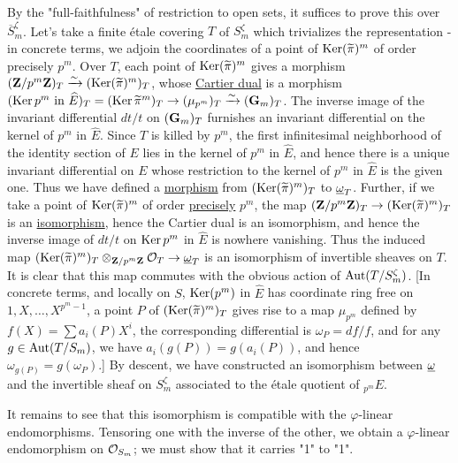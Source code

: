 \begin{kaproof}
By the "full-faithfulness" of restriction to open sets, it suffices to prove
this over $\overline{S}_m^\zeta$. Let's take a finite \'etale covering $T$ of
$S_m^\zeta$ which trivializes the representation - in concrete terms, we adjoin
the coordinates of a point of $\operatorname{Ker}(\widetilde{\pi})^m$ of order precisely
$p^m$. Over $T$, each point of $\operatorname{Ker}(\widetilde{\pi})^m$ gives a morphism
$(\mathbf{Z}/p^m\mathbf{Z})_T\xrightarrow{\sim}(\operatorname{Ker}(\widetilde{\pi})^m)_T$, whose \uline{Cartier
dual} is a morphism $(\operatorname{Ker} p^m \text{ in }\widehat{E})_T=(\operatorname{Ker}\widetilde{\pi}^m)_T
\to(\mu_{p^m})_T\xrightarrow{\sim}(\mathbf{G}_m)_T$. The inverse image of the invariant
differential $dt/t$ on $(\mathbf{G}_m)_T$ furnishes an invariant differential on the
kernel of $p^m$ in $\widehat{E}$. Since $T$ is killed by $p^m$, the first
infinitesimal neighborhood of the identity section of $E$ lies in the kernel of
$p^m$ in $\widehat{E}$, and hence there is a unique invariant differential on
$E$ whose restriction to the kernel of $p^m$ in $\widehat{E}$ is the given one.
Thus we have defined a \uline{morphism} from $(\operatorname{Ker}(\widetilde{\pi})^m)_T$ to
$\underline{\omega}_T$. Further, if we take a point of $\operatorname{Ker}(\widetilde{\pi})^m$ of order
\uline{precisely} $p^m$, the map $(\mathbf{Z}/p^m\mathbf{Z})_T\to(\operatorname{Ker}(\widetilde{\pi})^m)_T$
is an \uline{isomorphism}, hence the Cartier dual is an isomorphism, and hence
the inverse image of $dt/t$ on $\operatorname{Ker} p^m$ in $\widehat{E}$ is nowhere vanishing.
Thus the induced map
$(\operatorname{Ker}(\widetilde{\pi})^m)_T\otimes_{\mathbf{Z}/p^m\mathbf{Z}}\mathcal{O}_T\to\underline{\omega}_T$ is an isomorphism of
invertible sheaves on $T$. It is clear that this map commutes with the obvious
action of $\operatorname{Aut}(T/S_m^\zeta)$. [In concrete terms, and locally on $S$,
$\operatorname{Ker}(p^m)$ in $\widehat{E}$ has coordinate ring free on $1,X,\dots,X^{p^m-1}$,
a point $P$ of $(\operatorname{Ker}(\widetilde{\pi})^m)_T$ gives rise to a map $\mu_{p^m}$
defined by $f(X)=\sum a_i(P)X^i$, the corresponding differential is
$\omega_P=df/f$, and for any $g\in\operatorname{Aut}(T/S_m)$, we have $a_i(g(P))=g(a_i(P))$,
and hence $\omega_{g(P)}=g(\omega_P)$.] By descent, we have constructed an
isomorphism between $\underline{\omega}$ and the invertible sheaf on $S_m^\zeta$ associated to
the \'etale quotient of ${}_{p^m}E$.

It remains to see that this isomorphism is compatible with the $\varphi$-linear
endomorphisms. Tensoring one with the inverse of the other, we obtain a
$\varphi$-linear endomorphism on $\mathcal{O}_{S_m}$; we must show that it carries "1"
to "1".


\end{kaproof}
